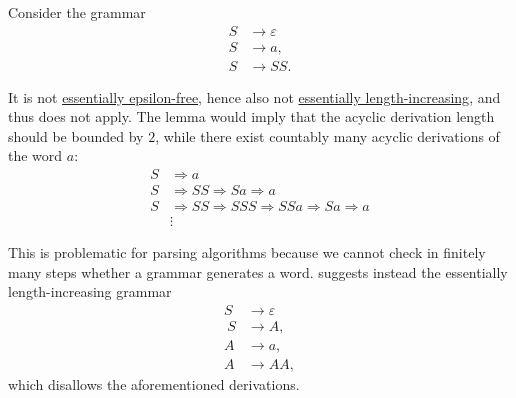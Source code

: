 \begin{example}\label{ex:thm:length_increasing_grammar}
  Consider the grammar
  \begin{equation}\label{eq:ex:thm:length_increasing_grammar/bad}
    \begin{aligned}
      S &\to \varepsilon \\
      S &\to a, \\
      S &\to SS.
    \end{aligned}
  \end{equation}

  It is not \hyperref[def:epsilon_free_grammar]{essentially epsilon-free}, hence also not \hyperref[def:length_increasing_grammar]{essentially length-increasing}, and thus  does not apply. The lemma would imply that the acyclic derivation length should be bounded by \( 2 \), while there exist countably many acyclic derivations of the word \( a \):
  \begin{equation*}
    \begin{aligned}
      S &\Rightarrow a \\
      S &\Rightarrow SS \Rightarrow Sa \Rightarrow a \\
      S &\Rightarrow SS \Rightarrow SSS \Rightarrow SSa \Rightarrow Sa \Rightarrow a \\
        &\vdots
    \end{aligned}
  \end{equation*}

  This is problematic for parsing algorithms because we cannot check in finitely many steps whether a grammar generates a word.  suggests instead the essentially length-increasing grammar
  \begin{equation*}
    \begin{aligned}
      S &\to \varepsilon \\\
      S &\to A, \\
      A &\to a, \\
      A &\to AA,
    \end{aligned}
  \end{equation*}
  which disallows the aforementioned derivations.
\end{example}

